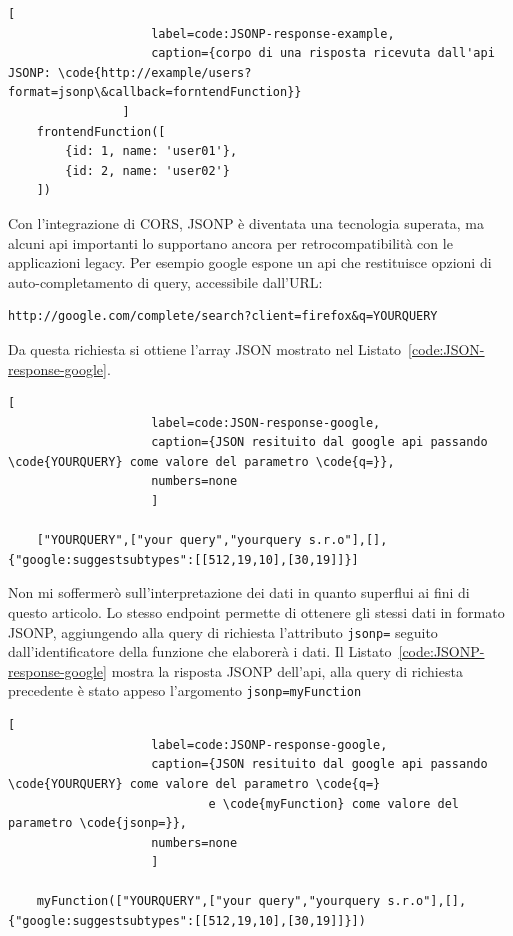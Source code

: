 \documentclass{sapthesis}
\newcommand{\code}[1]{\texttt{#1}}
\newcommand{\refCode}[1]{Listato~\ref{#1}}
\begin{document}
                \begin{lstlisting}[
                    label=code:JSONP-response-example,
                    caption={corpo di una risposta ricevuta dall'api JSONP: \code{http://example/users?format=jsonp\&callback=forntendFunction}}
                ]
    frontendFunction([
        {id: 1, name: 'user01'},
        {id: 2, name: 'user02'}
    ])
                \end{lstlisting}

                Con l'integrazione di CORS, JSONP è diventata una tecnologia superata, ma alcuni api importanti
                lo supportano ancora per retrocompatibilità con le applicazioni legacy. Per esempio google
                espone un api che restituisce opzioni di auto-completamento di query, accessibile dall'URL:
                \begin{lstlisting}[numbers=none]
    http://google.com/complete/search?client=firefox&q=YOURQUERY
                \end{lstlisting}
                Da questa richiesta si ottiene l'array JSON mostrato nel \refCode{code:JSON-response-google}.

                \begin{lstlisting}[
                    label=code:JSON-response-google, 
                    caption={JSON resituito dal google api passando \code{YOURQUERY} come valore del parametro \code{q=}},
                    numbers=none
                    ]

    ["YOURQUERY",["your query","yourquery s.r.o"],[],{"google:suggestsubtypes":[[512,19,10],[30,19]]}]
                \end{lstlisting}

                Non mi soffermerò sull'interpretazione dei dati in quanto superflui ai fini di questo articolo.
                Lo stesso endpoint permette di ottenere gli stessi dati in formato JSONP, aggiungendo alla query
                di richiesta l'attributo \code{jsonp=} seguito dall'identificatore della funzione che elaborerà
                i dati. Il \refCode{code:JSONP-response-google} mostra la risposta JSONP dell'api, alla query di
                richiesta precedente è stato appeso l'argomento \code{jsonp=myFunction}

                \begin{lstlisting}[
                    label=code:JSONP-response-google, 
                    caption={JSON resituito dal google api passando \code{YOURQUERY} come valore del parametro \code{q=}
                            e \code{myFunction} come valore del parametro \code{jsonp=}},
                    numbers=none
                    ]

    myFunction(["YOURQUERY",["your query","yourquery s.r.o"],[],{"google:suggestsubtypes":[[512,19,10],[30,19]]}])

                \end{lstlisting}
\end{document}
